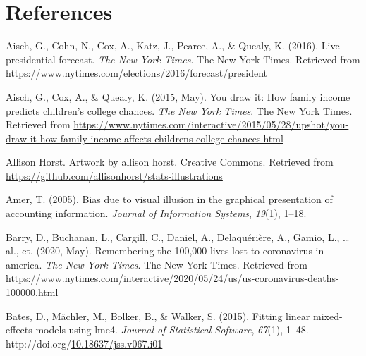 \documentclass[print]{nuthesis}
\newlength{\cslhangindent}
\newenvironment{CSLReferences}%
{\setlength{\parindent}{0pt}%
\everypar{\setlength{\hangindent}{\cslhangindent}}\ignorespaces}%
{\par}
\begin{document}
\backmatter

\hypertarget{references}{%
\chapter*{References}\label{references}}

\noindent

\setlength{\parindent}{-0.20in}
\setlength{\leftskip}{0.20in}
\setlength{\parskip}{8pt}

\hypertarget{refs}{}
\begin{CSLReferences}{1}{0}
\leavevmode{}%
Aisch, G., Cohn, N., Cox, A., Katz, J., Pearce, A., \& Quealy, K. (2016). Live presidential forecast. \emph{The New York Times}. The New York Times. Retrieved from \url{https://www.nytimes.com/elections/2016/forecast/president}

\leavevmode{}%
Aisch, G., Cox, A., \& Quealy, K. (2015, May). You draw it: How family income predicts children's college chances. \emph{The New York Times}. The New York Times. Retrieved from \url{https://www.nytimes.com/interactive/2015/05/28/upshot/you-draw-it-how-family-income-affects-childrens-college-chances.html}

\leavevmode{}%
Allison Horst. Artwork by allison horst. Creative Commons. Retrieved from \url{https://github.com/allisonhorst/stats-illustrations}

\leavevmode{}%
Amer, T. (2005). Bias due to visual illusion in the graphical presentation of accounting information. \emph{Journal of Information Systems}, \emph{19}(1), 1--18.

\leavevmode{}%
Barry, D., Buchanan, L., Cargill, C., Daniel, A., Delaquérière, A., Gamio, L., \ldots{} al., et. (2020, May). Remembering the 100,000 lives lost to coronavirus in america. \emph{The New York Times}. The New York Times. Retrieved from \url{https://www.nytimes.com/interactive/2020/05/24/us/us-coronavirus-deaths-100000.html}

\leavevmode{}%
Bates, D., Mächler, M., Bolker, B., \& Walker, S. (2015). Fitting linear mixed-effects models using {lme4}. \emph{Journal of Statistical Software}, \emph{67}(1), 1--48. http://doi.org/\href{https://doi.org/10.18637/jss.v067.i01}{10.18637/jss.v067.i01}


\end{CSLReferences}
\end{document}
